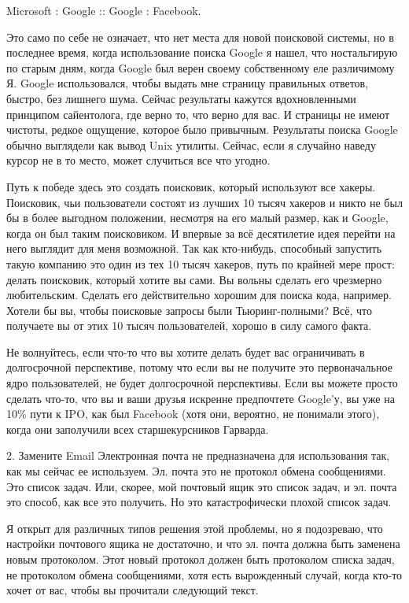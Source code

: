\documentclass[ebook,12pt,oneside,openany]{memoir}
\begin{document}
Microsoft : Google :: Google : Facebook.

Это само по себе не означает, что нет места для новой поисковой
системы, но в последнее время, когда использование поиска Google я
нашел, что ностальгирую по старым дням, когда Google был верен своему
собственному еле различимому Я. Google использовался, чтобы выдать мне
страницу правильных ответов, быстро, без лишнего шума. Сейчас
результаты кажутся вдохновленными принципом сайентолога, где верно то,
что верно для вас. И страницы не имеют чистоты, редкое ощущение,
которое было привычным. Результаты поиска Google обычно выглядели как
вывод Unix утилиты. Сейчас, если я случайно наведу курсор не в то
место, может случиться все что угодно.

Путь к победе здесь это создать поисковик, который используют все
хакеры. Поисковик, чьи пользователи состоят из лучших 10 тысяч хакеров
и никто не был бы в более выгодном положении, несмотря на его малый
размер, как и Google, когда он был таким поисковиком. И впервые за всё
десятилетие идея перейти на него выглядит для меня возможной. Так как
кто-нибудь, способный запустить такую компанию это один из тех 10
тысяч хакеров, путь по крайней мере прост: делать поисковик, который
хотите вы сами. Вы вольны сделать его чрезмерно любительским. Сделать
его действительно хорошим для поиска кода, например. Хотели бы вы,
чтобы поисковые запросы были Тьюринг-полными? Всё, что получаете вы от
этих 10 тысяч пользователей, хорошо в силу самого факта.

Не волнуйтесь, если что-то что вы хотите делать будет вас ограничивать
в долгосрочной перспективе, потому что если вы не получите это
первоначальное ядро пользователей, не будет долгосрочной перспективы.
Если вы можете просто сделать что-то, что вы и ваши друзья искренне
предпочтете Google’у, вы уже на 10\% пути к IPO, как был Facebook
(хотя они, вероятно, не понимали этого), когда они заполучили всех
старшекурсников Гарварда.

2. Замените Email Электронная почта не предназначена для использования
так, как мы сейчас ее используем. Эл. почта это не протокол обмена
сообщениями. Это список задач. Или, скорее, мой почтовый ящик это
список задач, и эл. почта это способ, как все это получить. Но это
катастрофически плохой список задач.

Я открыт для различных типов решения этой проблемы, но я подозреваю,
что настройки почтового ящика не достаточно, и что эл. почта должна
быть заменена новым протоколом. Этот новый протокол должен быть
протоколом списка задач, не протоколом обмена сообщениями, хотя есть
вырожденный случай, когда кто-то хочет от вас, чтобы вы прочитали
следующий текст.
\end{document}
